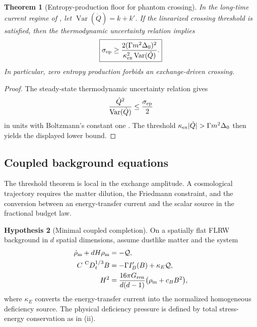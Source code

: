 \documentclass[11pt]{article}
\newtheorem{theorem}{Theorem}[section]
\theoremstyle{definition}
\newtheorem{hypothesis}[theorem]{Hypothesis}
\theoremstyle{remark}
\newcommand{\Gren}{G_{\mathrm{ren}}}
\begin{document}
\begin{theorem}[Entropy-production floor for phantom crossing]
\label{thm:crossing-entropy-floor}
In the long-time current regime of
, let
\(\operatorname{Var}(\dot Q)=k+k'\).  If the linearized crossing threshold is
satisfied, then the thermodynamic uncertainty relation implies
\[
 \boxed{
 \sigma_{\rm ep}\ge
 \frac{2(\Gamma m^2\Delta_0)^2}
 {\kappa_{\rm ex}^2\operatorname{Var}(\dot Q)}.}
\]
In particular, zero entropy production forbids an exchange-driven crossing.
\end{theorem}

\begin{proof}
The steady-state thermodynamic uncertainty relation gives
\[
  \frac{\dot Q^2}{\operatorname{Var}(\dot Q)}
  \le\frac{\sigma_{\rm ep}}{2}
\]
in units with Boltzmann's constant one
\cite{BaratoSeifert2015,Gingrich2016,HorowitzGingrich2020}.  The threshold
\(\kappa_{\rm ex}|\dot Q|>\Gamma m^2\Delta_0\) then yields the displayed lower
bound.
\end{proof}

\subsection{Coupled background equations}
\label{subsec:coupled-dark-energy-cosmology}

The threshold theorem is local in the exchange amplitude.  A cosmological
trajectory requires the matter dilution, the Friedmann constraint, and the
conversion between an energy-transfer current and the scalar source in the
fractional budget law.

\begin{hypothesis}[Minimal coupled completion]
\label{hyp:coupled-deficiency-completion}
On a spatially flat FLRW background in \(d\) spatial dimensions, assume dustlike
matter and the system
\begin{align}
 \dot\rho_{\rm m}+dH\rho_{\rm m}&=-\mathcal Q,
 \\
 C\,\prescript{\mathrm C}{}{D}_t^{1/3}B
 &=-\Gamma I_B'(B)+\kappa_E\mathcal Q,
 \\
 H^2&=\frac{16\pi\Gren}{d(d-1)}
       \bigl(\rho_{\rm m}+c_BB^2\bigr),
\end{align}
where \(\kappa_E\) converts the energy-transfer current into the normalized
homogeneous deficiency source.  The physical deficiency pressure is defined by
total stress-energy conservation as in
(ii).
\end{hypothesis}
\end{document}
